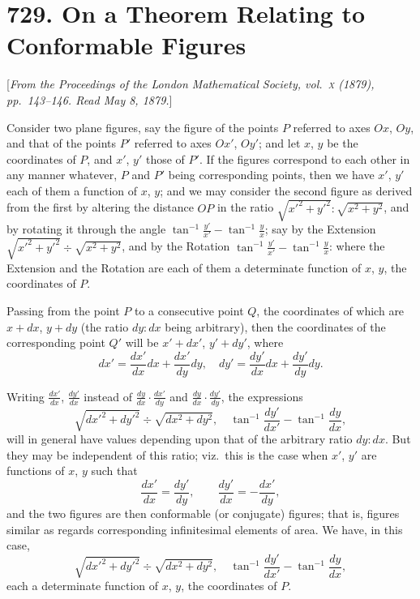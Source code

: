 \documentclass[11pt,a4paper]{book}
\begin{document}
\newpage
\section*{729. On a Theorem Relating to Conformable Figures}

[\textit{From the Proceedings of the London Mathematical Society, vol.~\textsc{x} (1879), pp.~143--146.
Read May 8, 1879.}]

Consider two plane figures, say the figure of the points $P$ referred
to axes $Ox$, $Oy$, and that of the points $P'$ referred to axes $Ox'$, $Oy'$;
and let $x$, $y$ be the coordinates of $P$, and $x'$, $y'$ those of $P'$.
If the figures correspond to each other in any manner whatever,
$P$ and $P'$ being corresponding points, then we have $x'$, $y'$ each of
them a function of $x$, $y$; and we may consider the second figure as
derived from the first by altering the distance $OP$ in the ratio
$\sqrt{x'^2+y'^2}:\sqrt{x^2+y^2}$, and by rotating it through the angle
$\tan^{-1}\frac{y'}{x'}-\tan^{-1}\frac{y}{x}$; say by the Extension
$\sqrt{x'^2+y'^2}\div\sqrt{x^2+y^2}$, and by the Rotation
$\tan^{-1}\frac{y'}{x'}-\tan^{-1}\frac{y}{x}$: where the Extension and the Rotation
are each of them a determinate function of $x$, $y$, the coordinates of $P$.

Passing from the point $P$ to a consecutive point $Q$, the coordinates
of which are $x+dx$, $y+dy$ (the ratio $dy:dx$ being arbitrary), then the
coordinates of the corresponding point $Q'$ will be $x'+dx'$, $y'+dy'$,
where
\[
dx' = \frac{dx'}{dx}dx + \frac{dx'}{dy}dy,\quad
dy' = \frac{dy'}{dx}dx + \frac{dy'}{dy}dy.
\]

Writing $\frac{dx'}{dx}$, $\frac{dy'}{dx}$ instead of $\frac{dy}{dx}\cdot\frac{dx'}{dy}$ and
$\frac{dy}{dx}\cdot\frac{dy'}{dy}$, the expressions
\[
\sqrt{dx'^2+dy'^2}\div\sqrt{dx^2+dy^2},\quad
\tan^{-1}\frac{dy'}{dx'}-\tan^{-1}\frac{dy}{dx},
\]
will in general have values depending upon that of the arbitrary ratio $dy:dx$.
But they may be independent of this ratio; viz.~this is the case when
$x'$, $y'$ are functions of $x$, $y$ such that
\[
\frac{dx'}{dx} = \frac{dy'}{dy},\qquad \frac{dy'}{dx} = -\frac{dx'}{dy},
\]
and the two figures are then conformable (or conjugate) figures; that is,
figures similar as regards corresponding infinitesimal elements of area.
We have, in this case,
\[
\sqrt{dx'^2+dy'^2}\div\sqrt{dx^2+dy^2},\quad
\tan^{-1}\frac{dy'}{dx'}-\tan^{-1}\frac{dy}{dx},
\]
each a determinate function of $x$, $y$, the coordinates of $P$.
\end{document}
